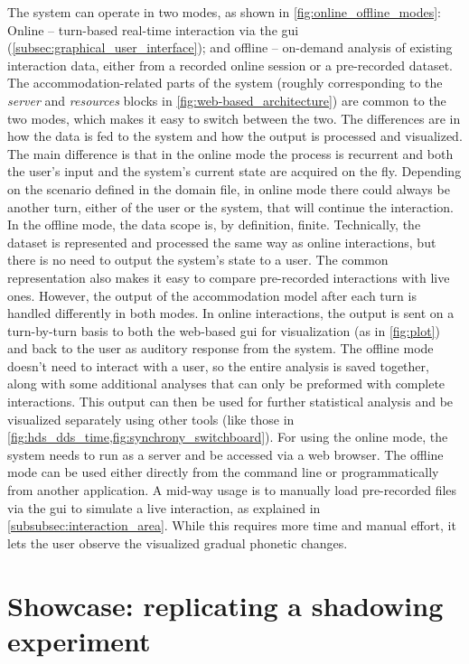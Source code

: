 The system can operate in two modes, as shown in \cref{fig:online_offline_modes}:
Online -- turn-based real-time interaction via the \ac{gui} (\cref{subsec:graphical_user_interface}); and offline -- on-demand analysis of existing interaction data, either from a recorded online session or a pre-recorded dataset.
The accommodation-related parts of the system (roughly corresponding to the \emph{server} and \emph{resources} blocks in \cref{fig:web-based_architecture}) are common to the two modes, which makes it easy to switch between the two.
The differences are in how the data is fed to the system and how the output is processed and visualized.
The main difference is that in the online mode the process is recurrent and both the user's input and the system's current state are acquired on the fly.
Depending on the scenario defined in the domain file, in online mode there could always be another turn, either of the user or the system, that will continue the interaction.
In the offline mode, the data scope is, by definition, finite.
Technically, the dataset is represented and processed the same way as online interactions, but there is no need to output the system's state to a user.
The common representation also makes it easy to compare pre-recorded interactions with live ones.
However, the output of the accommodation model after each turn is handled differently in both modes.
In online interactions, the output is sent on a turn-by-turn basis to both the web-based \ac{gui} for visualization (as in \cref{fig:plot}) and back to the user as auditory response from the system.
The offline mode doesn't need to interact with a user, so the entire analysis is saved together, along with some additional analyses that can only be preformed with complete interactions.
This output can then be used for further statistical analysis and be visualized separately using other tools (like those in \cref{fig:hds_dds_time,fig:synchrony_switchboard}).
For using the online mode, the system needs to run as a server and be accessed via a web browser.
The offline mode can be used either directly from the command line or programmatically from another application.
A mid-way usage is to manually load pre-recorded files via the \ac{gui} to simulate a live interaction, as explained in \cref{subsubsec:interaction_area}.
While this requires more time and manual effort, it lets the user observe the visualized gradual phonetic changes.

\section{Showcase: replicating a shadowing experiment}
\label{sec:showcase}

